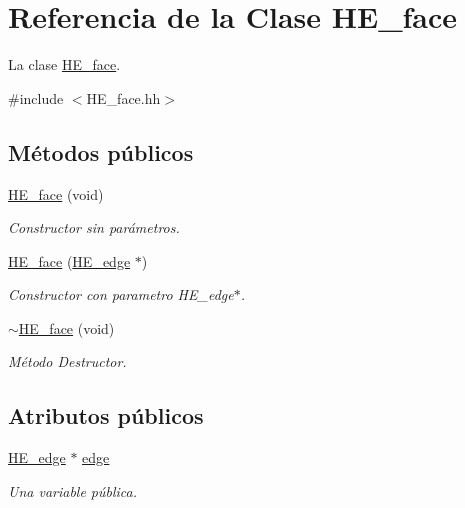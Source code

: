 \hypertarget{class_h_e__face}{\section{Referencia de la Clase H\-E\-\_\-face}
\label{class_h_e__face}
}


La clase \hyperlink{class_h_e__face}{H\-E\-\_\-face}.  




{\ttfamily \#include $<$H\-E\-\_\-face.\-hh$>$}

\subsection*{Métodos públicos}
\begin{DoxyCompactItemize}
\item 
\hyperlink{class_h_e__face_a5a42e8e7beb962f0d0c27108a61ff79d}{H\-E\-\_\-face} (void)
\begin{DoxyCompactList}\small\item\em Constructor sin parámetros. \end{DoxyCompactList}\item 
\hyperlink{class_h_e__face_a3330fcf146ccd9f35cc2b80222945680}{H\-E\-\_\-face} (\hyperlink{class_h_e__edge}{H\-E\-\_\-edge} $\ast$)
\begin{DoxyCompactList}\small\item\em Constructor con parametro H\-E\-\_\-edge$\ast$. \end{DoxyCompactList}\item 
\hypertarget{class_h_e__face_a6b4e8b2669e7cdf54b97af891364544c}{\hyperlink{class_h_e__face_a6b4e8b2669e7cdf54b97af891364544c}{$\sim$\-H\-E\-\_\-face} (void)}\label{class_h_e__face_a6b4e8b2669e7cdf54b97af891364544c}

\begin{DoxyCompactList}\small\item\em Método Destructor. \end{DoxyCompactList}\end{DoxyCompactItemize}
\subsection*{Atributos públicos}
\begin{DoxyCompactItemize}
\item 
\hyperlink{class_h_e__edge}{H\-E\-\_\-edge} $\ast$ \hyperlink{class_h_e__face_a11989659578fb40c2586d452d298eb03}{edge}
\begin{DoxyCompactList}\small\item\em Una variable pública. \end{DoxyCompactList}\end{DoxyCompactItemize}


